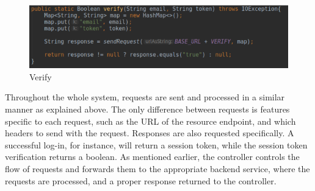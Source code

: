 \begin{figure}[ht]
  \centering
  \includegraphics[scale=0.75]{figs/verify.png}
  \caption{Verify}
  \label{fig:databaseconfig}
\end{figure}

\noindent Throughout the whole system, requests are sent and processed in a similar manner as explained above. The only difference between requests is features specific to each request, such as the URL of the resource endpoint, and which headers to send with the request. Responses are also requested specifically. A successful log-in, for instance, will return a session token, while the session token verification returns a boolean. As mentioned earlier, the controller controls the flow of requests and forwards them to the appropriate backend service, where the requests are processed, and a proper response returned to the controller. 

%

